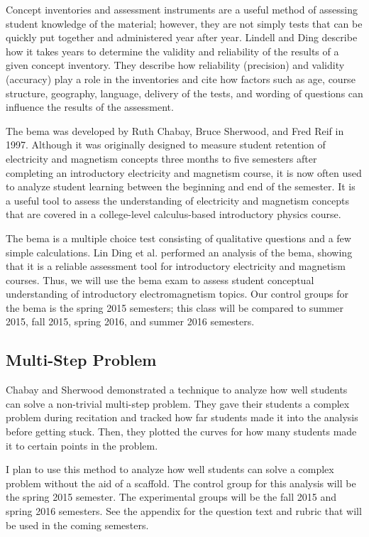 Concept inventories and assessment instruments are a useful method of assessing student knowledge of the material; however, they are not simply tests that can be quickly put together and administered year after year. Lindell and Ding describe how it takes years to determine the validity and reliability of the results of a given concept inventory. They describe how reliability (precision) and validity (accuracy) play a role in the inventories and cite how factors such as age, course structure, geography, language, delivery of the tests, and wording of questions can influence the results of the assessment\cite{lindell2012}.

The \gls{bema} was developed by Ruth Chabay, Bruce Sherwood, and Fred Reif in 1997. Although it was originally designed to measure student retention of electricity and magnetism concepts three months to five semesters after completing an introductory electricity and magnetism course, it is now often used to analyze student learning between the beginning and end of the semester. It is a useful tool to assess the understanding of electricity and magnetism concepts that are covered in a college-level calculus-based introductory physics course\cite{ding2006}.

The \gls{bema} is a multiple choice test consisting of qualitative questions and a few simple calculations. Lin Ding et al. performed an analysis of the \gls{bema}, showing that it is a reliable assessment tool for introductory electricity and magnetism courses\cite{ding2006}. Thus, we will use the \gls{bema} exam to assess student conceptual understanding of introductory electromagnetism topics. Our control groups for the \gls{bema} is the spring 2015 semesters; this class will be compared to summer 2015, fall 2015, spring 2016, and summer 2016 semesters.

\subsection{Multi-Step Problem}

Chabay and Sherwood demonstrated a technique to analyze how well students can solve a non-trivial multi-step problem\cite{sherwood2005, chabay2014}. They gave their students a complex problem during recitation and tracked how far students made it into the analysis before getting stuck. Then, they plotted the curves for how many students made it to certain points in the problem.

I plan to use this method to analyze how well students can solve a complex problem without the aid of a scaffold. The control group for this analysis will be the spring 2015 semester. The experimental groups will be the fall 2015 and spring 2016 semesters. See the appendix for the question text and rubric that will be used in the coming semesters.

